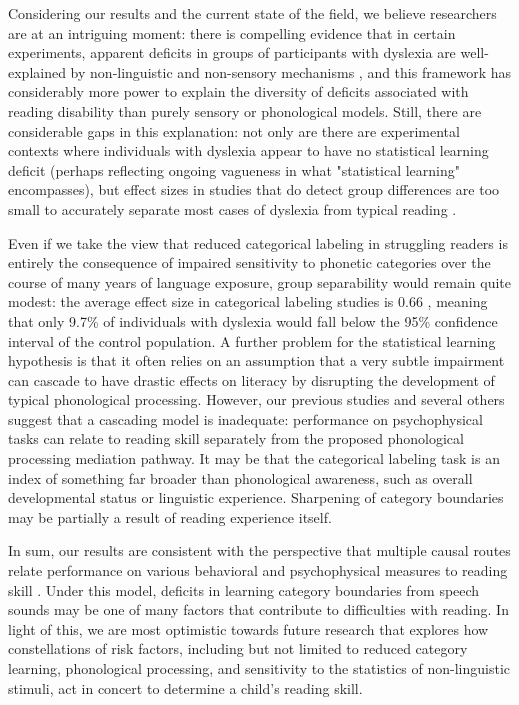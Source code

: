 \documentclass[../uwthesis.tex]{subfiles}
\begin{document}
Considering our results and the current state of the field, we believe researchers are at an intriguing moment: there is compelling evidence that in certain experiments, apparent deficits in groups of participants with dyslexia are well-explained by non-linguistic and non-sensory mechanisms \citep{Gabay2015,Banai2004,Banai2006}, and this framework has considerably more power to explain the diversity of deficits associated with reading disability than purely sensory or phonological models. Still, there are considerable gaps in this explanation: not only are there are experimental contexts where individuals with dyslexia appear to have no statistical learning deficit \citep{Gabay2018,Staels2015NoDyslexia,Gould1990DoDeficit,Inacio2018ImplicitChildren,Jimenez-Fernandez2011DyslexicCueing,Samara2017ArtificialLearning,Du2013ImplicitInformation} (perhaps reflecting ongoing vagueness in what "statistical learning" encompasses), but effect sizes in studies that do detect group differences are too small to accurately separate most cases of dyslexia from typical reading \citep{Lieder2019PerceptualDyslexia,Vandermosten2018StatisticalChildren}. 

Even if we take the view that reduced categorical labeling in struggling readers is entirely the consequence of impaired sensitivity to phonetic categories over the course of many years of language exposure, group separability would remain quite modest: the average effect size in categorical labeling studies is 0.66 \citep{Noordenbos2015}, meaning that only 9.7\% of individuals with dyslexia would fall below the 95\% confidence interval of the control population. A further problem for the statistical learning hypothesis is that it often relies on an assumption that a very subtle impairment can cascade to have drastic effects on literacy by disrupting the development of typical phonological processing. However, our previous studies \citep{OBrien2018,OBrien2019CategoricalDuration} and several others \citep{Robertson2009,Snowling2019LongitudinalDyslexia,Talcott2000,Calcus2018} suggest that a cascading model is inadequate: performance on psychophysical tasks can relate to reading skill separately from the proposed phonological processing mediation pathway. It may be that the categorical labeling task is an index of something far broader than phonological awareness, such as overall developmental status or linguistic experience. Sharpening of category boundaries may be partially a result of reading experience itself.

In sum, our results are consistent with the perspective that multiple causal routes relate performance on various behavioral and psychophysical measures to reading skill \citep{Pennington2012IndividualModels.,Ziegler2019ModelingDyslexia}. Under this model, deficits in learning category boundaries from speech sounds may be one of many factors that contribute to difficulties with reading. In light of this, we are most optimistic towards future research that explores how constellations of risk factors, including but not limited to reduced category learning, phonological processing, and sensitivity to the statistics of non-linguistic stimuli, act in concert to determine a child's reading skill. 
\end{document}
